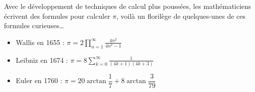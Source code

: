 \begin{enigme}
       Avec le développement de techniques de calcul plus poussées, les mathématiciens écrivent des formules pour calculer $\pi$, voilà un florilège de quelques-unes de ces formules curieuses\dots \\
       \begin{itemize}
          \item Wallis en 1655 : \qquad $\pi = \displaystyle{2\prod_{n=1}^{\infty}\frac{4n^2}{4n^2-1}}$ \\ [1mm]
          \item Leibniz en 1674 : \quad $\pi =\displaystyle{8\sum_{k=0}^{\infty}\frac{1}{(4k+1)(4k+3)}}$ \\
          \item Euler en 1760 : \qquad $\pi =20\arctan\dfrac17+8\arctan\dfrac{3}{79}$
       \end{itemize}
\end{enigme}  
%     
